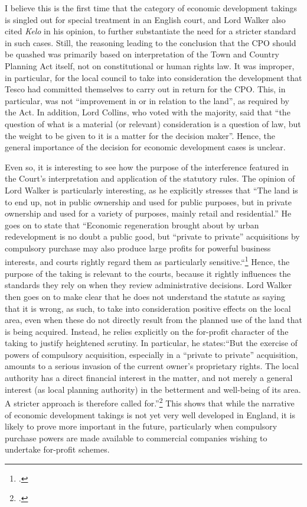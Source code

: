 I believe this is the first time that the category of economic development takings is singled out for special treatment in an English court, and Lord Walker also cited {\it Kelo} in his opinion, to further substantiate the need for a stricter standard in such cases. Still, the reasoning leading to the conclusion that the CPO should be quashed was primarily based on interpretation of the Town and Country Planning Act itself, not on constitutional or human rights law. It was improper, in particular, for the local council to take into consideration the development that Tesco had committed themselves to carry out in return for the CPO. This, in particular, was not ``improvement in or in relation to the land'', as required by the Act. In addition, Lord Collins, who voted with the majority, said that ``the question of what is a material (or relevant) consideration is a question of law, but the weight to be given to it is a matter for the decision maker''. Hence, the general importance of the decision for economic development cases is unclear. 

Even so, it is interesting to see how the purpose of the interference featured in the Court's interpretation and application of the statutory rules. The opinion of Lord Walker is particularly interesting, as he explicitly stresses that ``The land is to end up, not in public ownership and used for public purposes, but in private ownership and used for a variety of purposes, mainly retail and residential.'' He goes on to state that ``Economic regeneration brought about by urban redevelopment is no doubt a public good, but ``private to private'' acquisitions by compulsory purchase may also produce large profits for powerful business interests, and courts rightly regard them as particularly sensitive.``\footcite[81]{sainsbury10} Hence, the purpose of the taking is relevant to the courts, because it rightly influences the standards they rely on when they review administrative decisions. Lord Walker then goes on to make clear that he does not understand the statute as saying that it is wrong, as such, to take into consideration positive effects on the local area, even when these do not directly result from the planned use of the land that is being acquired. Instead, he relies explicitly on the for-profit character of the taking to justify heightened scrutiny. In particular, he states:``But the exercise of powers of compulsory acquisition, especially in a ``private to private'' acquisition, amounts to a serious invasion of the current owner's proprietary rights. The local authority has a direct financial interest in the matter, and not merely a general interest (as local planning authority) in the betterment and well-being of its area. A stricter approach is therefore called for.''\footcite[84]{sainsbury10} This shows that while the narrative of economic development takings is not yet very well developed in England, it is likely to prove more important in the future, particularly when compulsory purchase powers are made available to commercial companies wishing to undertake for-profit schemes. 

